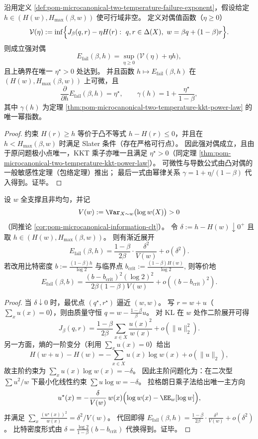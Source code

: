 \begin{theorem}\label{thm:pom-microcanonical-two-temperature-strong-duality-sensitivity}
沿用定义 \ref{def:pom-microcanonical-two-temperature-failure-exponent}，假设给定 \(h\in(H(w),H_{\max}(\beta,w))\) 使可行域非空。
定义对偶值函数（\(\eta\ge 0\)）
\[
\mathcal{V}(\eta):=\inf\Bigl\{J_\beta(q,r)-\eta H(r):\ q,r\in\Delta(X),\ w=\beta q+(1-\beta)r\Bigr\}.
\]
则成立强对偶
\[
E_{\mathrm{fail}}(\beta,h)=\sup_{\eta\ge 0}\bigl(\mathcal{V}(\eta)+\eta h\bigr),
\]
且上确界在唯一 \(\eta^\star>0\) 处达到。
并且函数 \(h\mapsto E_{\mathrm{fail}}(\beta,h)\) 在 \((H(w),H_{\max}(\beta,w))\) 上可微，且
\[
\frac{\partial}{\partial h}E_{\mathrm{fail}}(\beta,h)=\eta^\star,
\qquad
\gamma(h)=1+\frac{\eta^\star}{1-\beta},
\]
其中 \(\gamma(h)\) 为定理 \ref{thm:pom-microcanonical-two-temperature-kkt-power-law} 的唯一幂指数。
\end{theorem}
\begin{proof}
约束 \(H(r)\ge h\) 等价于凸不等式 \(h-H(r)\le 0\)，并且在 \(h< H_{\max}(\beta,w)\) 时满足 Slater 条件（存在严格可行点）。
因此强对偶成立，且由于原问题极小点唯一，KKT 乘子亦唯一且满足 \(\eta^\star>0\)（同定理 \ref{thm:pom-microcanonical-two-temperature-kkt-power-law}）。
可微性与导数公式由凸对偶的一般敏感性定理（包络定理）推出；
最后一式由幂律关系 \(\gamma=1+\eta/(1-\beta)\) 代入得到。证毕。
\end{proof}

\begin{theorem}\label{thm:pom-microcanonical-two-temperature-critical-quadratic-law}
设 \(w\) 全支撑且非均匀，并记
\[
V(w):=\Var_{X\sim w}\bigl(\log w(X)\bigr)>0
\]
（同推论 \ref{cor:pom-microcanonical-information-clt}）。
令 \(\delta:=h-H(w)\downarrow 0^+\) 且取 \(h\in(H(w),H_{\max}(\beta,w))\)。
则有渐近展开
\[
E_{\mathrm{fail}}(\beta,h)
=\frac{1-\beta}{2\beta}\cdot \frac{\delta^2}{V(w)}+o(\delta^2).
\]
若改用比特密度
\(
b:=\frac{(1-\beta)h}{\log 2}
\)
与临界点
\(
b_{\mathrm{crit}}:=\frac{(1-\beta)H(w)}{\log 2}
\),
则等价地
\[
E_{\mathrm{fail}}(\beta,b)
=\frac{(b-b_{\mathrm{crit}})^2(\log 2)^2}{2\beta(1-\beta)V(w)}+o\!\left((b-b_{\mathrm{crit}})^2\right).
\]
\end{theorem}
\begin{proof}
当 \(\delta\downarrow 0\) 时，最优点 \((q^\star,r^\star)\) 逼近 \((w,w)\)。
写 \(r=w+u\)（\(\sum_x u(x)=0\)），则由质量守恒 \(q=w-\frac{1-\beta}{\beta}u\)。
对 KL 在 \(w\) 处作二阶展开可得
\[
J_\beta(q,r)
=\frac{1-\beta}{2\beta}\sum_{x\in X}\frac{u(x)^2}{w(x)}+o(\|u\|_2^2).
\]
另一方面，熵的一阶变分（利用 \(\sum_x u(x)=0\)）给出
\[
H(w+u)-H(w)=-\sum_{x\in X}u(x)\log w(x)+o(\|u\|_2),
\]
故主阶约束为 \(\sum_x u(x)\log w(x)=-\delta\)。
因此主阶问题化为：在二次型 \(\sum u^2/w\) 下最小化线性约束 \(\sum u\log w=-\delta\)。
拉格朗日乘子法给出唯一主方向
\[
u^\star(x)=-\frac{\delta}{V(w)}\,w(x)\Bigl(\log w(x)-\EE_w[\log w]\Bigr),
\]
并满足
\(
\sum_x\frac{(u^\star(x))^2}{w(x)}=\delta^2/V(w)
\)。
代回即得
\(
E_{\mathrm{fail}}(\beta,h)=\frac{1-\beta}{2\beta}\cdot \frac{\delta^2}{V(w)}+o(\delta^2)
\)。
比特密度形式由 \(\delta=\frac{\log 2}{1-\beta}(b-b_{\mathrm{crit}})\) 代换得到。证毕。
\end{proof}


